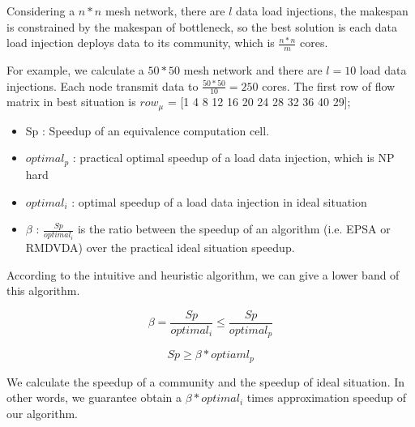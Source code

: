 Considering a $n*n$ mesh network, there are $l$ data load injections, the makespan is constrained by the makespan of bottleneck, so the best solution is each data load injection deploys data to its community, which is $\frac{n*n}{m}$ cores.  

For example, we calculate a $50*50$ mesh network and there are $l = 10$ load data injections.
Each node transmit data to $\frac{50*50}{10} = 250$ cores.  The first row of flow matrix in best situation is $row_{\mu}$ = [1     4     8    12    16    20    24   28  32  36  40  29];



\begin{itemize}
\item Sp : Speedup of an equivalence computation cell.
\item $optimal_{p}$ : practical optimal speedup of a load data injection, which is NP hard \cite{Liu_schedulingdivisible}
\item $optimal_{i}$ : optimal speedup of a load data injection in ideal situation
\item $\beta$ :  $\frac{Sp}{optimal_{i}}$ is the ratio between the speedup of an algorithm (i.e. EPSA or RMDVDA) over the practical ideal situation speedup.
\end{itemize}

According to the intuitive and heuristic algorithm, we can give a lower band of this algorithm.

$$\beta = \frac{Sp}{optimal_{i}} \leq \frac{Sp}{optimal_{p}}$$

$$Sp  \geq \beta * optiaml_{p}$$

We calculate the speedup of a community and the speedup of ideal situation.  In other words, we guarantee obtain a $\beta * optimal_{i}$ times approximation speedup of our algorithm.
